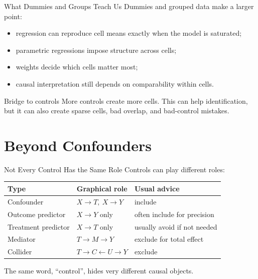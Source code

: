 \documentclass[11pt,aspectratio=169]{beamer}
\begin{document}
\begin{frame}{What Dummies and Groups Teach Us}
  Dummies and grouped data make a larger point:
  \begin{itemize}
    \item regression can reproduce cell means exactly when the model is saturated;
    \item parametric regressions impose structure across cells;
    \item weights decide which cells matter most;
    \item causal interpretation still depends on comparability within cells.
  \end{itemize}
  \begin{block}{Bridge to controls}
    More controls create more cells. This can help identification, but it can also create sparse cells, bad overlap, and bad-control mistakes.
  \end{block}
\end{frame}

\section{Beyond Confounders}

\begin{frame}{Not Every Control Has the Same Role}
  Controls can play different roles:
  \begin{center}
    \begin{tabular}{@{}lll@{}}
      \toprule
      Type & Graphical role & Usual advice \\
      \midrule
      Confounder & \(X\rightarrow T,\ X\rightarrow Y\) & include \\
      Outcome predictor & \(X\rightarrow Y\) only & often include for precision \\
      Treatment predictor & \(X\rightarrow T\) only & usually avoid if not needed \\
      Mediator & \(T\rightarrow M\rightarrow Y\) & exclude for total effect \\
      Collider & \(T\rightarrow C\leftarrow U\rightarrow Y\) & exclude \\
      \bottomrule
    \end{tabular}
  \end{center}
  \vspace{0.3em}
  The same word, ``control'', hides very different causal objects.
\end{frame}
\end{document}
